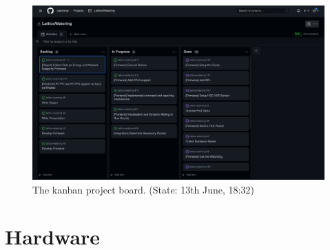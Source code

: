 \documentclass[10pt, a4paper]{article}
\begin{document}
    \begin{figure}[!hbtp]
        \centering
        \includegraphics[width=\linewidth]{img/kanban_board.png}
        \caption{The kanban project board. (State: 13th June, 18:32)}
    \end{figure}

    \section{Hardware}
\end{document}
